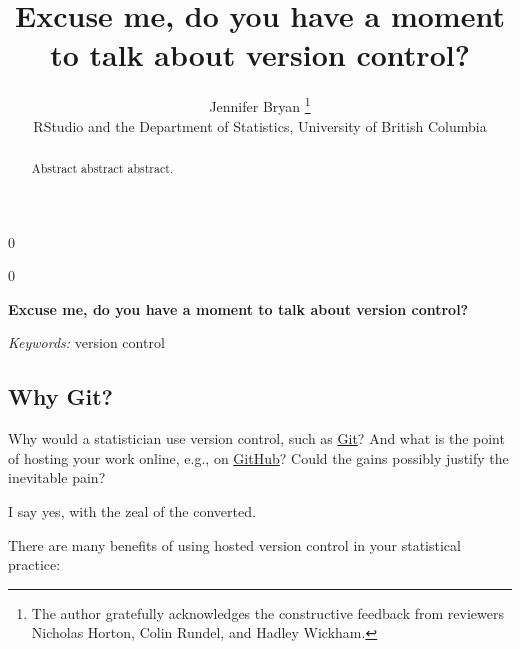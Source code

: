 \documentclass[12pt]{article}
\newcommand{\blind}{0}
\begin{document}
\def\spacingset#1{\renewcommand{\baselinestretch}%
{#1}\small\normalsize} \spacingset{1}



\blind
{
  \title{\bf Excuse me, do you have a moment to talk about version control?}

  \author{
        Jennifer Bryan \thanks{The author gratefully acknowledges the constructive feedback from
reviewers Nicholas Horton, Colin Rundel, and Hadley Wickham.} \\
    RStudio and the Department of Statistics, University of British Columbia\\
      }
  \maketitle
} \fi

\blind
{
  \bigskip
  \bigskip
  \bigskip
  \begin{center}
    {\LARGE\bf Excuse me, do you have a moment to talk about version control?}
  \end{center}
  \medskip
} \fi

\bigskip
\begin{abstract}
Abstract abstract abstract.
\end{abstract}

\noindent%
{\it Keywords:} version control
\vfill

\newpage
\spacingset{1.45} %

\subsection{Why Git?}\label{why-git}

Why would a statistician use version control, such as
\href{http://git-scm.com}{Git}? And what is the point of hosting your
work online, e.g., on \href{https://github.com}{GitHub}? Could the gains
possibly justify the inevitable pain?

I say yes, with the zeal of the converted.

There are many benefits of using hosted version control in your
statistical practice:
\end{document}
